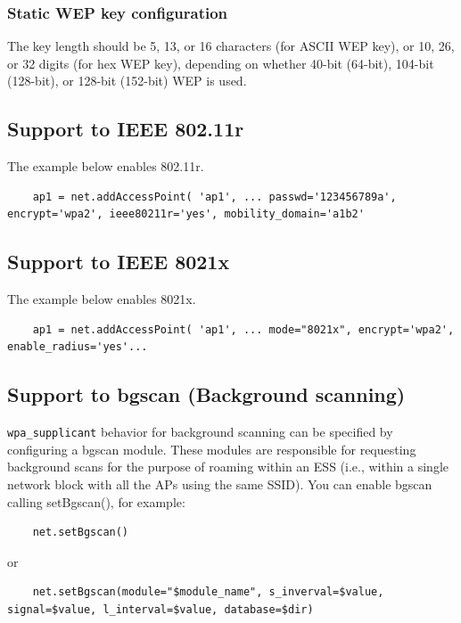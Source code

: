 \subsubsection{Static WEP key configuration}
The key length should be 5, 13, or 16 characters (for ASCII WEP key), or 10, 26, or 32 digits (for hex WEP key), depending on whether 40-bit (64-bit), 104-bit (128-bit), or 128-bit (152-bit) WEP is used.

\subsection{Support to IEEE 802.11r}

The example below enables 802.11r.

\begin{verbatim}
    ap1 = net.addAccessPoint( 'ap1', ... passwd='123456789a', encrypt='wpa2', ieee80211r='yes', mobility_domain='a1b2'
\end{verbatim}

\subsection{Support to IEEE 8021x}

The example below enables 8021x.

\begin{verbatim}
    ap1 = net.addAccessPoint( 'ap1', ... mode="8021x", encrypt='wpa2', enable_radius='yes'...
\end{verbatim}

\subsection{Support to bgscan (Background scanning)}

\texttt{wpa\_supplicant} behavior for background scanning can be specified by configuring a bgscan module. These modules are responsible for requesting background scans for the purpose of roaming within an ESS (i.e., within a single network block with all the APs using the same SSID). You can enable bgscan calling setBgscan(), for example:

\begin{verbatim}
    net.setBgscan()
\end{verbatim}
or
\begin{verbatim}
    net.setBgscan(module="$module_name", s_inverval=$value, signal=$value, l_interval=$value, database=$dir)
\end{verbatim}


